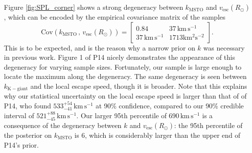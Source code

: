\documentclass[useAMS,twocolumn,usenatbib]{mn2e}
\def\kms{{\,\mathrm{km\,s^{-1}}}}
\def\vesc{{v_\mathrm{esc}}}
\begin{document}
Figure \ref{fig:SPL_corner} shows a strong degeneracy between $k_\mathrm{MSTO}$ and $\vesc(R_\odot)$, which can be encoded by the empirical covariance matrix of the samples
%
\begin{equation}
\mathrm{Cov}\left(k_\mathrm{MSTO}\,,\,\vesc(R_\odot)\right) = \begin{bmatrix} 0.84 & 37\kms \\ 37\kms & 1713 \mathrm{km^2s^{-2}}\end{bmatrix}.
\end{equation}
%
This is to be expected, and is the reason why a narrow prior on $k$ was necessary in previous work. 
Figure 1 of P14 nicely demonstrates the appearance of this degeneracy for varying sample sizes. 
Fortunately, our sample is large enough to locate the maximum along the degeneracy. 
The same degeneracy is seen between $k_\mathrm{K-giant}$ and the local escape speed, though it is broader.
Note that this explains why our statistical uncertainty on the local escape speed is larger than that of of P14, who found $533^{+54}_{-41}\kms$ at 90\% confidence, compared to our 90\% credible interval of $521^{+88}_{-45}\kms$.
Our larger 95th percentile of $690\kms$ is a consequence of the degeneracy between $k$ and $\vesc(R_\odot)$: the 95th percentile of the posterior on $k_\mathrm{MSTO}$ is 6, which is considerably larger than the upper end of P14's prior.
\end{document}
